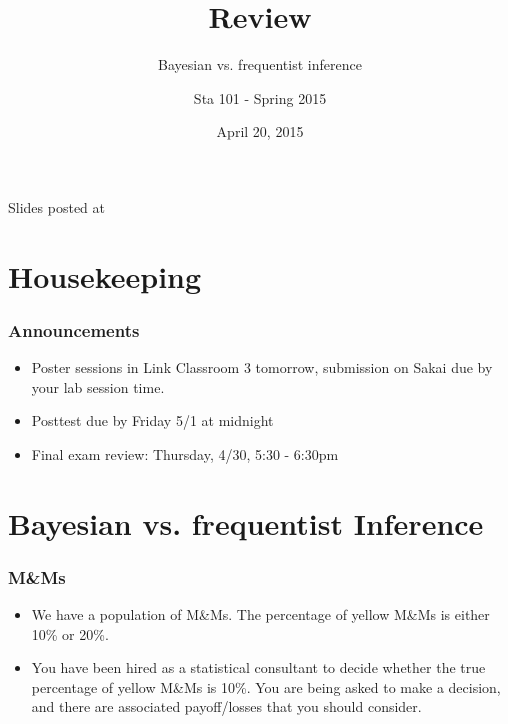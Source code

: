 \documentclass[11pt,containsverbatim,handout,xcolor=xelatex,dvipsnames,table]{beamer}
\title{Review}
\subtitle{Bayesian vs. frequentist inference}
\author{Sta 101 - Spring 2015}
\date{April 20, 2015}
\institute{Duke University, Department of Statistical Science}
\begin{document}


\begin{frame}[plain]

\titlepage
\vfill
{\scriptsize {} \hfill Slides posted at  \webLink{\CourseSite}{\CourseSite}}
\addtocounter{framenumber}{-1} 

\end{frame}


\section{Housekeeping}


\begin{frame}
\frametitle{Announcements}

\begin{itemize}

\item Poster sessions in Link Classroom 3 tomorrow, submission on Sakai due by your lab session time.

\item Posttest due by Friday 5/1 at midnight

\item Final exam review: Thursday, 4/30, 5:30 - 6:30pm

\end{itemize}

\end{frame}


\section{Bayesian vs. frequentist Inference}


\begin{frame}
\frametitle{M\&Ms}

\begin{itemize}

\item We have a population of M\&Ms. The percentage of yellow M\&Ms is either 10\% or 20\%.

\item You have been hired as a statistical consultant to decide whether the true percentage of yellow M\&Ms is 10\%. You are being asked to make a decision, and there are associated payoff/losses that you should consider.

\end{itemize}

\end{frame}
\end{document}
